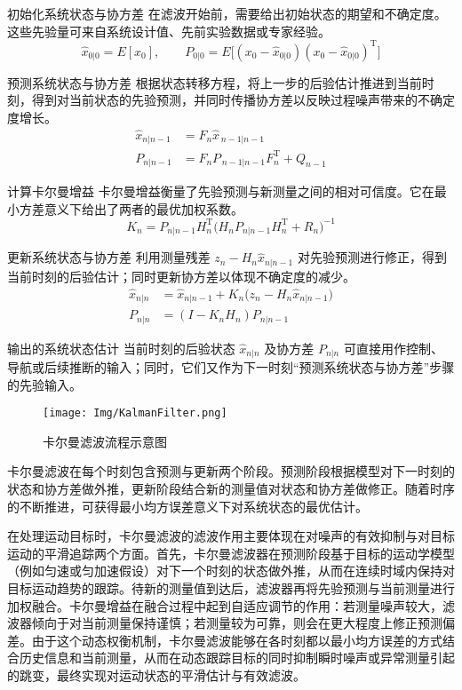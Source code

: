 初始化系统状态与协方差  
在滤波开始前，需要给出初始状态的期望和不确定度。这些先验量可来自系统设计值、先前实验数据或专家经验。  
\begin{equation}
	\hat x_{0|0}=E[x_0], \qquad
	P_{0|0}=E\!\bigl[(x_0-\hat x_{0|0})(x_0-\hat x_{0|0})^\mathrm T\bigr]
\end{equation}

预测系统状态与协方差  
根据状态转移方程，将上一步的后验估计推进到当前时刻，得到对当前状态的先验预测，并同时传播协方差以反映过程噪声带来的不确定度增长。  
\begin{align}
	\hat x_{n|n-1} &= F_n \hat x_{\,n-1|n-1} \\
	P_{n|n-1}      &= F_n P_{\,n-1|n-1} F_n^\mathrm T + Q_{n-1}
\end{align}

计算卡尔曼增益  
卡尔曼增益衡量了先验预测与新测量之间的相对可信度。它在最小方差意义下给出了两者的最优加权系数。  
\begin{equation}
	K_n = P_{n|n-1} H_n^\mathrm T \!\bigl(H_n P_{n|n-1} H_n^\mathrm T + R_n\bigr)^{-1}
\end{equation}

更新系统状态与协方差  
利用测量残差 \(z_n-H_n\hat x_{n|n-1}\) 对先验预测进行修正，得到当前时刻的后验估计；同时更新协方差以体现不确定度的减少。  
\begin{align}
	\hat x_{n|n} &= \hat x_{n|n-1} + K_n\!\bigl(z_n - H_n \hat x_{n|n-1}\bigr)\\
	P_{n|n}      &= (I - K_n H_n) P_{n|n-1}
\end{align}

输出的系统状态估计  
当前时刻的后验状态 \(\hat x_{n|n}\) 及协方差 \(P_{n|n}\) 可直接用作控制、导航或后续推断的输入；同时，它们又作为下一时刻“预测系统状态与协方差”步骤的先验输入。  

\begin{figure}[htbp]
	\centering
	\texttt{[image: Img/KalmanFilter.png]}
	\caption{卡尔曼滤波流程示意图}
	\label{fig:KalmanFilter}
\end{figure}

卡尔曼滤波在每个时刻包含预测与更新两个阶段。预测阶段根据模型对下一时刻的状态和协方差做外推，更新阶段结合新的测量值对状态和协方差做修正。随着时序的不断推进，可获得最小均方误差意义下对系统状态的最优估计。

在处理运动目标时，卡尔曼滤波的滤波作用主要体现在对噪声的有效抑制与对目标运动的平滑追踪两个方面。首先，卡尔曼滤波器在预测阶段基于目标的运动学模型（例如匀速或匀加速假设）对下一个时刻的状态做外推，从而在连续时域内保持对目标运动趋势的跟踪。待新的测量值到达后，滤波器再将先验预测与当前测量进行加权融合。卡尔曼增益在融合过程中起到自适应调节的作用：若测量噪声较大，滤波器倾向于对当前测量保持谨慎；若测量较为可靠，则会在更大程度上修正预测偏差。由于这个动态权衡机制，卡尔曼滤波能够在各时刻都以最小均方误差的方式结合历史信息和当前测量，从而在动态跟踪目标的同时抑制瞬时噪声或异常测量引起的跳变，最终实现对运动状态的平滑估计与有效滤波。

